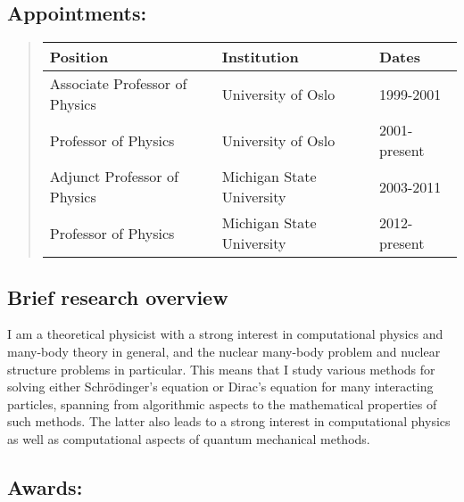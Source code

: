 \documentclass[a4wide,10pt]{article}
\begin{document}
\subsection*{Appointments:}


\begin{quote}
\begin{tabular}{|l|l|l|}
\hline
\multicolumn{1}{|l}{ Position } & \multicolumn{1}{|l}{ Institution } & \multicolumn{1}{|l|}{ Dates } \\
\hline
Associate Professor of Physics & University of Oslo        & 1999-2001    \\
Professor of Physics           & University of Oslo        & 2001-present \\
Adjunct Professor of Physics   & Michigan State University & 2003-2011    \\
Professor of Physics           & Michigan State University & 2012-present \\
\hline
\end{tabular}
\end{quote}


\subsection*{Brief research overview}

I am a theoretical physicist with a strong interest in 
computational physics and many-body theory in general, and 
the nuclear many-body problem and nuclear structure problems in particular. 
This means that I study various methods for solving either Schrödinger's equation or 
Dirac's equation for many interacting particles, spanning from 
algorithmic aspects to the mathematical properties of such methods. 
The latter also leads to a strong interest in computational 
physics as well as computational aspects of quantum mechanical methods. 

\subsection*{Awards:}
\end{document}
